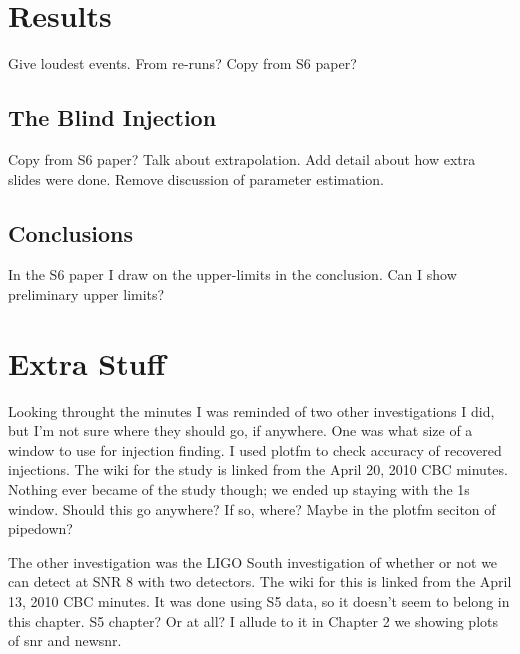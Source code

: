 \section{Results}

Give loudest events. From re-runs? Copy from S6 paper?

\subsection{The Blind Injection}

Copy from S6 paper? Talk about extrapolation. Add detail about how extra slides were done. Remove discussion of parameter estimation.

\subsection{Conclusions}

In the S6 paper I draw on the upper-limits in the conclusion. Can I show preliminary upper limits?

\section{Extra Stuff}

Looking throught the minutes I was reminded of two other investigations I did, but I'm not sure where they should go, if anywhere. One was what size of a window to use for injection finding. I used plotfm to check accuracy of recovered injections. The wiki for the study is linked from the April 20, 2010 CBC minutes. Nothing ever became of the study though; we ended up staying with the 1s window. Should this go anywhere? If so, where? Maybe in the plotfm seciton of pipedown?

The other investigation was the LIGO South investigation of whether or not we can detect at SNR 8 with two detectors. The wiki for this is linked from the April 13, 2010 CBC minutes. It was done using S5 data, so it doesn't seem to belong in this chapter. S5 chapter? Or at all? I allude to it in Chapter 2 we showing plots of snr and newsnr.

